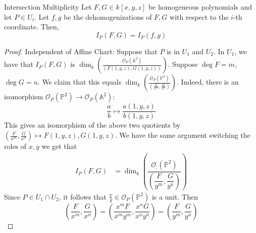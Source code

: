 \documentclass{report}
\begin{document}
\begin{definition}{Intersection Multiplicity}
    Let $F, G \in k[x, y, z]$ be homogeneous polynomials and let $P \in U_{i}$. Let $f, g$ be the dehomogenizations of $F, G$ with respect to the $i$-th coordinate. Then, 
        \begin{equation*}
            I_{P}(F, G) = I_{P}(f, g)
        \end{equation*}
\end{definition}
    \begin{proof}
        Independent of Affine Chart: Suppose that $P$ is in $U_{1}$ and $U_{2}$. In $U_{1}$, we have that $I_{P}(F, G)$ is $\dim_{k}(\frac{\mathcal{O}_{P}(\mathbb{A}^{2})}{(F(1, y, z), G(1, y, z))})$. Suppose $\deg F = m$, $\deg G = n$. We claim that this equals $\dim_{k}(\frac{\mathcal{O}_{P}(\mathbb{P}^{2})}{(\frac{F}{x^{m}}, \frac{G}{x^{n}})})$. Indeed, there is an isomorphism $\mathcal{O}_{P} (\mathbb{P}^{2}) \rightarrow \mathcal{O}_{P}(\mathbb{A}^{2})$:
            \begin{equation*}
                \dfrac{a}{b} \mapsto\dfrac{a(1, y, z)}{b(1 , y, z)}
            \end{equation*}
        This gives an isomorphism of the above two quotients by $(\frac{F}{x^{m}}, \frac{G}{x^{n}}) \mapsto F(1, y, z), G(1, y, z)$. We have the same argument switching the roles of $x, y$ we get that 
            \begin{align*}
                I_{P}(F, G) &= \dim_{k}\left(\dfrac{\mathcal{O}_{:}(\mathbb{P}^{2})}{\left(\dfrac{F}{y^{m}}, \dfrac{G}{y^{n}}\right)}\right)   
            \end{align*}
        Since $P \in U_{1} \cap U_{2}$, it follows that $\frac{x}{y} \in \mathcal{O}_{P}(\mathbb{P}^{2})$ is a unit. Then 
            \begin{equation*}
                \left(\dfrac{F}{x^{m}}, \dfrac{G}{x^{n}}\right) = \left(\dfrac{x^{m}F}{x^{m}y^{m}}, \dfrac{x^{n}G}{x^{n}y^{n}}\right) = \left(\dfrac{F}{y^{m}}, \dfrac{G}{y^{n}}\right)
            \end{equation*}
    \end{proof}
\end{document}
